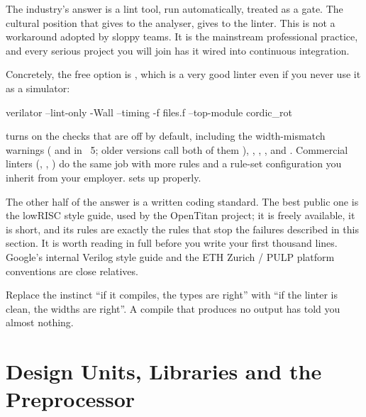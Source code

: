 The industry's answer is a lint tool, run automatically, treated as a gate. The
cultural position that \VHDL{} gives to the analyser, \SV{} gives to the
linter. This is not a workaround adopted by sloppy teams. It is the mainstream
professional practice, and every serious \SV{} project you will join has it
wired into continuous integration.

Concretely, the free option is , which is a very good linter
even if you never use it as a simulator:

\begin{shcode}
verilator --lint-only -Wall --timing -f files.f --top-module cordic_rot
\end{shcode}

 turns on the checks that are off by default, including the
width-mismatch warnings ( and  in
~5; older versions call both of them ),
, , ,  and
. Commercial linters (, ,
) do the same job with more rules and a rule-set
configuration you inherit from your employer.  sets
 up properly.

The other half of the answer is a written coding standard. The best public one
is the lowRISC style guide, used by the OpenTitan project; it is freely
available, it is short, and its rules are exactly the rules that stop the
failures described in this section.
 It is worth reading in full before you write your first
thousand lines. Google's internal Verilog style guide and the ETH Zurich /
PULP platform conventions are close relatives.

\begin{ruleofthumb}
Replace the instinct ``if it compiles, the types are right'' with ``if the
linter is clean, the widths are right''. A \SV{} compile that produces no
output has told you almost nothing.
\end{ruleofthumb}

\section{Design Units, Libraries and the Preprocessor}
\label{sec:philosophy:units}

